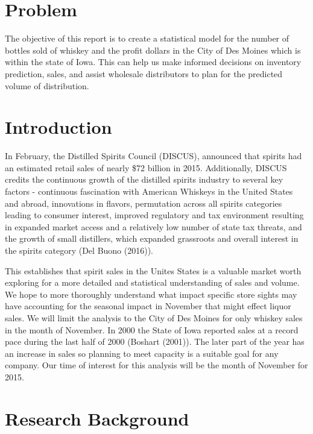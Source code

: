 \documentclass[]{elsarticle} %
\begin{document}
\section{Problem}\label{problem}

The objective of this report is to create a statistical model for the
number of bottles sold of whiskey and the profit dollars in the City of
Des Moines which is within the state of Iowa. This can help us make
informed decisions on inventory prediction, sales, and assist wholesale
distributors to plan for the predicted volume of distribution.

\section{Introduction}\label{introduction}

In February, the Distilled Spirits Council (DISCUS), announced that
spirits had an estimated retail sales of nearly \$72 billion in 2015.
Additionally, DISCUS credits the continuous growth of the distilled
spirits industry to several key factors - continuous fascination with
American Whiskeys in the United States and abroad, innovations in
flavors, permutation across all spirits categories leading to consumer
interest, improved regulatory and tax environment resulting in expanded
market access and a relatively low number of state tax threats, and the
growth of small distillers, which expanded grassroots and overall
interest in the spirits category (Del Buono (2016)).

This establishes that spirit sales in the Unites States is a valuable
market worth exploring for a more detailed and statistical understanding
of sales and volume. We hope to more thoroughly understand what impact
specific store sights may have accounting for the seasonal impact in
November that might effect liquor sales. We will limit the analysis to
the City of Des Moines for only whiskey sales in the month of November.
In 2000 the State of Iowa reported sales at a record pace during the
last half of 2000 (Boshart (2001)). The later part of the year has an
increase in sales so planning to meet capacity is a suitable goal for
any company. Our time of interest for this analysis will be the month of
November for 2015.

\section{Research Background}\label{research-background}
\end{document}
